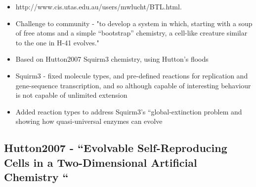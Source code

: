 		\begin{itemize}
			\item
			
			http://www.cis.utas.edu.au/users/mwlucht/BTL.html.
			
			\item
			
			Challenge to community - "to develop a system in which, starting with
			a soup of free atoms and a simple ``bootstrap'' chemistry, a cell-like
			creature similar to the one in H-41 evolves."
			
			\item
			
			Based on Hutton2007 Squirm3 chemistry, using Hutton's floods
			
			\item
			
			Squirm3 - fixed molecule types, and pre-defined reactions for
			replication and gene-sequence transcription, and so although capable
			of interesting behaviour is not capable of unlimited extension
			
			\item
			
			Added reaction types to address Squirm3's ``global-extinction problem
			and showing how quasi-universal enzymes can evolve
			
		\end{itemize}
		
		\hypertarget{hutton2007---evolvable-self-reproducing-cells-in-a-two-dimensional-artificial-chemistry}{\subsection{Hutton2007
				- ``Evolvable Self-Reproducing Cells in a Two-Dimensional Artificial
				Chemistry ``
			}\label{hutton2007---evolvable-self-reproducing-cells-in-a-two-dimensional-artificial-chemistry}}
		
